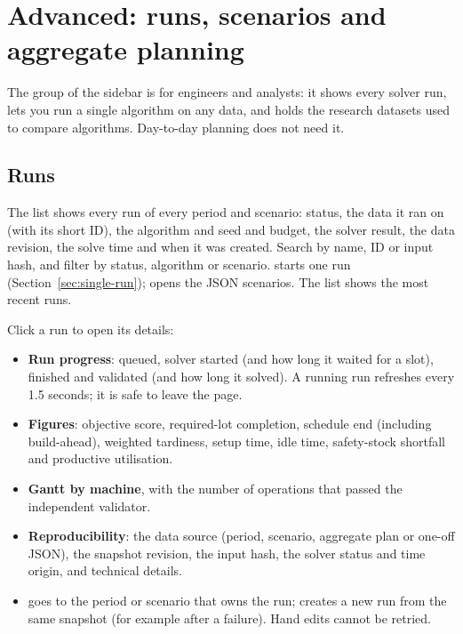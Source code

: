 \chapter{Advanced: runs, scenarios and aggregate planning}\label{ch:advanced}

The  group of the sidebar is for engineers and analysts: it shows every solver run, lets you run a
single algorithm on any data, and holds the research datasets used to compare algorithms. Day-to-day planning
does not need it.

\section{Runs}\label{sec:runs}


The list shows every run of every period and scenario: status, the data it ran on (with its short ID), the
algorithm and seed and budget, the solver result, the data revision, the solve time and when it was created.
Search by name, ID or input hash, and filter by status, algorithm or scenario.  starts one
run (Section~\ref{sec:single-run});  opens the JSON scenarios. The list shows the most recent runs.

Click a run to open its details:


\begin{itemize}
  \item \textbf{Run progress}: queued, solver started (and how long it waited for a slot), finished and
        validated (and how long it solved). A running run refreshes every 1.5 seconds; it is safe to leave
        the page.
  \item \textbf{Figures}: objective score, required-lot completion, schedule end (including build-ahead),
        weighted tardiness, setup time, idle time, safety-stock shortfall and productive utilisation.
  \item \textbf{Gantt by machine}, with the number of operations that passed the independent validator.
  \item \textbf{Reproducibility}: the data source (period, scenario, aggregate plan or one-off JSON), the snapshot
        revision, the input hash, the solver status and time origin, and technical details.
  \item {} goes to the period or scenario that owns the run; 
        creates a new run from the same snapshot (for example after a failure). Hand edits cannot be retried.
\end{itemize}

